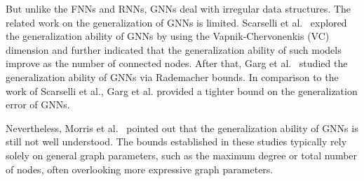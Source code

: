 But unlike the FNNs and RNNs, GNNs deal with irregular data structures. The related work on the generalization of GNNs is limited. Scarselli et al.~\cite{scarselli2018vapnik} explored the generalization ability of GNNs by using the Vapnik-Chervonenkis (VC) dimension and further indicated that the generalization ability of such models improve as the number of connected nodes. After that, Garg et al.~\cite{garg2020generalization} studied the generalization ability of GNNs via Rademacher bounds. In comparison to the work of Scarselli et al., Garg et al. provided a tighter bound on the generalization error of GNNs.

Nevertheless, Morris et al.~\cite{morris2024futuredirectionstheorygraph} pointed out that the generalization ability of GNNs is still not well understood. The bounds established in these studies typically rely solely on general graph parameters, such as the maximum degree or total number of nodes, often overlooking more expressive graph parameters.